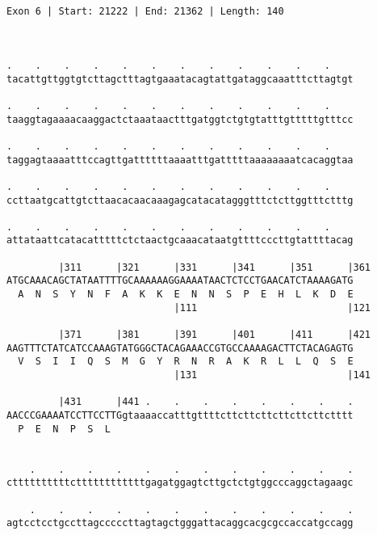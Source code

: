 \documentclass{article}
\begin{document}
\begin{Verbatim}
                             
 
Exon 6 | Start: 21222 | End: 21362 | Length: 140



.    .    .    .    .    .    .    .    .    .    .    .    
tacattgttggtgtcttagctttagtgaaatacagtattgataggcaaatttcttagtgt
                                                            
.    .    .    .    .    .    .    .    .    .    .    .    
taaggtagaaaacaaggactctaaataactttgatggtctgtgtatttgtttttgtttcc
                                                            
.    .    .    .    .    .    .    .    .    .    .    .    
taggagtaaaatttccagttgattttttaaaatttgatttttaaaaaaaatcacaggtaa
                                                            
.    .    .    .    .    .    .    .    .    .    .    .    
ccttaatgcattgtcttaacacaacaaagagcatacatagggtttctcttggtttctttg
                                                            
.    .    .    .    .    .    .    .    .    .    .    .    
attataattcatacatttttctctaactgcaaacataatgttttcccttgtattttacag
                                                            
         |311      |321      |331      |341      |351      |361
ATGCAAACAGCTATAATTTTGCAAAAAAGGAAAATAACTCTCCTGAACATCTAAAAGATG
  A  N  S  Y  N  F  A  K  K  E  N  N  S  P  E  H  L  K  D  E
                             |111                          |121
  
         |371      |381      |391      |401      |411      |421
AAGTTTCTATCATCCAAAGTATGGGCTACAGAAACCGTGCCAAAAGACTTCTACAGAGTG
  V  S  I  I  Q  S  M  G  Y  R  N  R  A  K  R  L  L  Q  S  E
                             |131                          |141
  
         |431      |441 .    .    .    .    .    .    .    .
AACCCGAAAATCCTTCCTTGgtaaaaccatttgttttcttcttcttcttcttcttctttt
  P  E  N  P  S  L                                          
                                                            
  
    .    .    .    .    .    .    .    .    .    .    .    .
cttttttttttcttttttttttttgagatggagtcttgctctgtggcccaggctagaagc
                                                            
    .    .    .    .    .    .    .    .    .    .    .    .
agtcctcctgccttagcccccttagtagctgggattacaggcacgcgccaccatgccagg
                                                            

\end{Verbatim}
\end{document}
